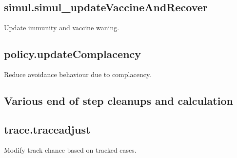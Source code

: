 \documentclass[]{article}
\begin{document}
\subsection{simul.simul\_updateVaccineAndRecover}
Update immunity and vaccine waning.

\subsection{policy.updateComplacency}
Reduce avoidance behaviour due to complacency.

\subsection{Various end of step cleanups and calculation}

\subsection{trace.traceadjust}
Modify track chance based on tracked cases.
\end{document}
